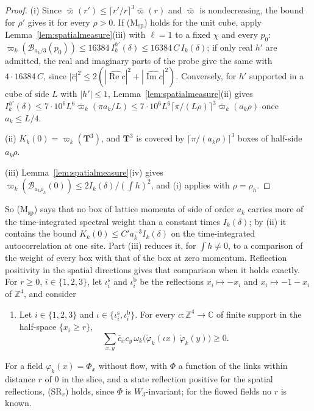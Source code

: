 \documentclass[aps,prd,twocolumn,superscriptaddress,nofootinbib,longbibliography,floatfix,amsmath,amssymb,10pt]{revtex4-2}
\theoremstyle{definition}
\theoremstyle{remark}
\newcommand{\Z}{\mathbb{Z}}
\newcommand{\C}{\mathbb{C}}
\begin{document}
\begin{proof}
(i) Since $\bar\varpi(r')\le\lceil r'/r\rceil^3\bar\varpi(r)$ and
$\bar\varpi$ is nondecreasing, the bound for $\rho'$ gives it for every
$\rho>0$. If (M$_{\mathrm{sp}}$) holds for the unit cube, apply
Lemma~\ref{lem:spatialmeasure}(iii) with $\ell=1$ to a fixed $\chi$ and
every $p_0$: $\varpi_k(\mathcal B_{a_k/3}(p_0))\le16384\,I^{h'}_k(\delta)
\le16384\,C\,I_k(\delta)$; if only real $h'$ are admitted, the real and
imaginary parts of the probe give the same with $4\cdot16384\,C$, since
$|\hat c|^2\le2(|\widehat{\operatorname{Re}c}|^2+|\widehat{\operatorname{Im}
c}|^2)$. Conversely, for $h'$ supported in a cube of side
$L$ with $|h'|\le1$, Lemma~\ref{lem:spatialmeasure}(ii) gives
$I^{h'}_k(\delta)\le7\cdot10^6L^6\bar\varpi_k(\pi a_k/L)\le7\cdot10^6L^6
\lceil\pi/(L\rho)\rceil^3\bar\varpi_k(a_k\rho)$ once $a_k\le L/4$.

(ii) $K_k(0)=\varpi_k(\mathbf T^3)$, and $\mathbf T^3$ is covered by
$\lceil\pi/(a_k\rho)\rceil^3$ boxes of half-side $a_k\rho$.

(iii) Lemma~\ref{lem:spatialmeasure}(iv) gives $\varpi_k(\mathcal
B_{a_k\rho_h}(0))\le2I_k(\delta)/(\int h)^2$, and (i) applies with
$\rho=\rho_h$.
\end{proof}

So (M$_{\mathrm{sp}}$) says that no box of lattice momenta of side of order
$a_k$ carries more of the time-integrated spectral weight than a constant
times $I_k(\delta)$; by (ii) it contains the bound $K_k(0)\le C'a_k^{-3}
I_k(\delta)$ on the time-integrated autocorrelation at one site. Part (iii)
reduces it, for $\int h\ne0$, to a comparison of the weight of every box
with that of the box at zero momentum. Reflection positivity in the spatial
directions gives that comparison when it holds exactly. For $r\ge0$,
$i\in\{1,2,3\}$, let $\iota^{\mathrm s}_i$ and $\iota^{\mathrm b}_i$
be the reflections $x_i\mapsto-x_i$ and $x_i\mapsto-1-x_i$ of $\Z^4$, and
consider
\begin{enumerate}[label=\textup{(SR$_r$)},leftmargin=*]
\item Let $i\in\{1,2,3\}$ and $\iota\in\{\iota^{\mathrm s}_i,
\iota^{\mathrm b}_i\}$. For every $c:\Z^4\to\C$ of finite support in
the half-space $\{x_i\ge r\}$,
\[
\sum_{x,y}\bar c_xc_y\,\omega_k\bigl(\mathring\varphi_k(\iota x)\,
\mathring\varphi_k(y)\bigr)\ge0 .
\]
\end{enumerate}
For a field $\varphi_k(x)=\Phi_x$ without flow, with $\Phi$ a function of
the links within distance $r$ of $0$ in the slice, and a state reflection
positive for the spatial reflections, \textup{(SR$_r$)} holds, since $\Phi$
is $W_3$-invariant; for the flowed fields no $r$ is known.
\end{document}
